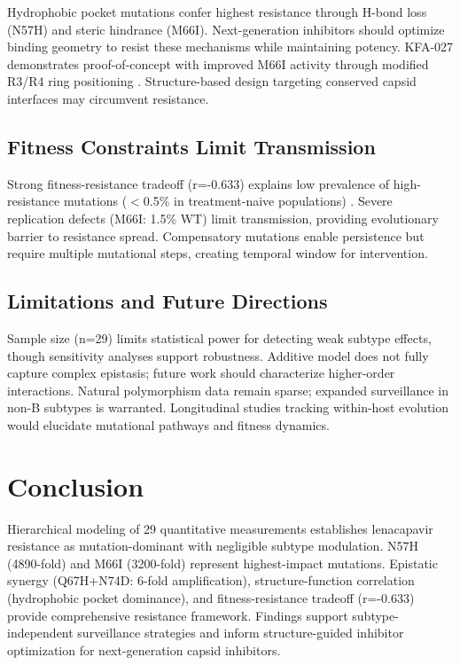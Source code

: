 \documentclass[preprint]{elsarticle}
\begin{document}
Hydrophobic pocket mutations confer highest resistance through H-bond loss (N57H) and steric hindrance (M66I). Next-generation inhibitors should optimize binding geometry to resist these mechanisms while maintaining potency. KFA-027 demonstrates proof-of-concept with improved M66I activity through modified R3/R4 ring positioning \cite{Yant2022}. Structure-based design targeting conserved capsid interfaces may circumvent resistance.

\subsection{Fitness Constraints Limit Transmission}

Strong fitness-resistance tradeoff (r=-0.633) explains low prevalence of high-resistance mutations ($<$0.5\% in treatment-naive populations) \cite{Andreatta2024}. Severe replication defects (M66I: 1.5\% WT) limit transmission, providing evolutionary barrier to resistance spread. Compensatory mutations enable persistence but require multiple mutational steps, creating temporal window for intervention.

\subsection{Limitations and Future Directions}

Sample size (n=29) limits statistical power for detecting weak subtype effects, though sensitivity analyses support robustness. Additive model does not fully capture complex epistasis; future work should characterize higher-order interactions. Natural polymorphism data remain sparse; expanded surveillance in non-B subtypes is warranted. Longitudinal studies tracking within-host evolution would elucidate mutational pathways and fitness dynamics.

\section{Conclusion}

Hierarchical modeling of 29 quantitative measurements establishes lenacapavir resistance as mutation-dominant with negligible subtype modulation. N57H (4890-fold) and M66I (3200-fold) represent highest-impact mutations. Epistatic synergy (Q67H+N74D: 6-fold amplification), structure-function correlation (hydrophobic pocket dominance), and fitness-resistance tradeoff (r=-0.633) provide comprehensive resistance framework. Findings support subtype-independent surveillance strategies and inform structure-guided inhibitor optimization for next-generation capsid inhibitors.
\end{document}
